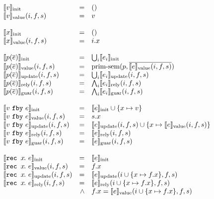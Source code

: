 \begin{figure}
  \small
  \[
  \begin{array}{lrl}
    \sysinit{v} & = & () \\
    \sysvalue{v}(i, f, s) & = & v \\
    \\
    \sysinit{x} & = & () \\
    \sysvalue{x}(i, f, s) & = & i.x \\
    \\
    \sysinit{p(\ov{e})} & = & \bigcup_i \sysinit{e_i} \\
    \sysvalue{p(\ov{e})}(i, f, s) & = & \text{prim-sem}(p, \ov{\sysvalue{e}(i, f, s)}) \\
    \sysupdate{p(\ov{e})}(i, f, s) & = & \bigcup_i \sysupdate{e_i}(i, f, s) \\
    \sysrely{p(\ov{e})}(i, f, s) & = & \bigwedge_i \sysrely{e_i}(i, f, s) \\
    \sysguar{p(\ov{e})}(i, f, s) & = & \bigwedge_i \sysguar{e_i}(i, f, s) \\
    \\
    \sysinit{\xfby{v}{e}} & = & \sysinit{e} \cup \{ x \mapsto v \} \\
    \sysvalue{\xfby{v}{e}}(i, f, s) & = & s.x \\
    \sysupdate{\xfby{v}{e}}(i, f, s) & = & \sysupdate{e}(i, f, s) \cup \{x \mapsto \sysvalue{e}(i, f, s)\}\\
    \sysrely{\xfby{v}{e}}(i, f, s) & = & \sysrely{e}(i, f, s) \\
    \sysguar{\xfby{v}{e}}(i, f, s) & = & \sysguar{e}(i, f, s) \\
    \\
    \sysinit{\xrec{x}{e}} & = & \sysinit{e} \\
    \sysvalue{\xrec{x}{e}}(i, f, s) & = & f.x \\
    \sysupdate{\xrec{x}{e}}(i, f, s) & = & \sysupdate{e}(i \cup \{ x \mapsto f.x \}, f, s)\\
    \sysrely{\xrec{x}{e}}(i, f, s) & = & \sysrely{e}(i \cup \{ x \mapsto f.x \}, f, s) \\
          & \wedge & f.x = \sysvalue{e}(i \cup \{ x \mapsto f.x \}, f, s) \\

\end{array}\]
\end{figure}
